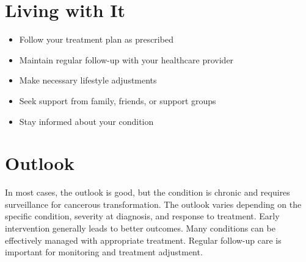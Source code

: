 \section{Living with It}
\begin{itemize}[noitemsep]
  \item Follow your treatment plan as prescribed
  \item Maintain regular follow-up with your healthcare provider
  \item Make necessary lifestyle adjustments
  \item Seek support from family, friends, or support groups
  \item Stay informed about your condition
\end{itemize}
\section{Outlook}
In most cases, the outlook is good, but the condition is chronic and requires surveillance for cancerous transformation. The outlook varies depending on the specific condition, severity at diagnosis, and response to treatment. Early intervention generally leads to better outcomes. Many conditions can be effectively managed with appropriate treatment. Regular follow-up care is important for monitoring and treatment adjustment.
